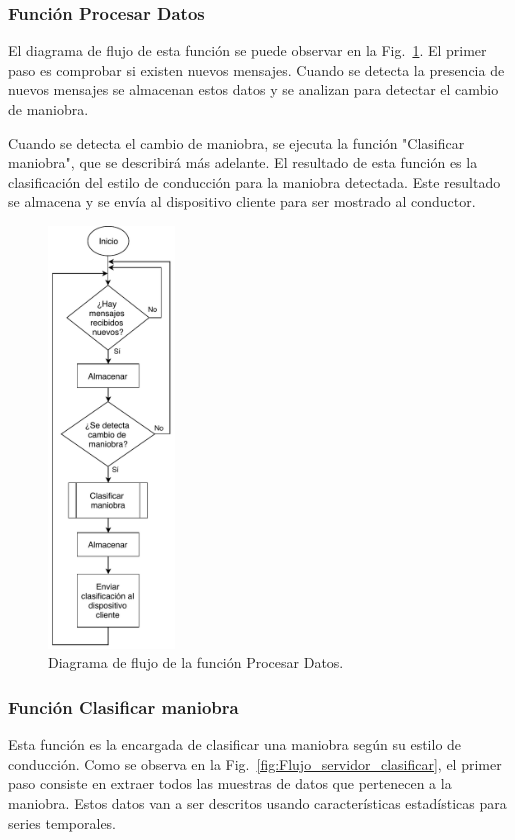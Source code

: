 \subsubsection{Función Procesar Datos}
El diagrama de flujo de esta función se puede observar en la Fig.~\ref{fig:Flujo_servidor_procesar}. El primer paso es comprobar si existen nuevos mensajes. Cuando se detecta la presencia de nuevos mensajes se almacenan estos datos y se analizan para detectar el cambio de maniobra.

Cuando se detecta el cambio de maniobra, se ejecuta la función "Clasificar maniobra", que se describirá más adelante. El resultado de esta función es la clasificación del estilo de conducción para la maniobra detectada. Este resultado se almacena y se envía al dispositivo cliente para ser mostrado al conductor.

\begin{figure}[bth!]
\centering
\includegraphics[width=0.3\textwidth]{Flujo_servidor_procesar.pdf}
\caption{Diagrama de flujo de la función Procesar Datos.}
\label{fig:Flujo_servidor_procesar}
\end{figure}

\subsubsection{Función Clasificar maniobra}
Esta función es la encargada de clasificar una maniobra según su estilo de conducción. Como se observa en la Fig.~\ref{fig:Flujo_servidor_clasificar}, el primer paso consiste en extraer todos las muestras de datos que pertenecen a la maniobra. Estos datos van a ser descritos usando características estadísticas para series temporales.

